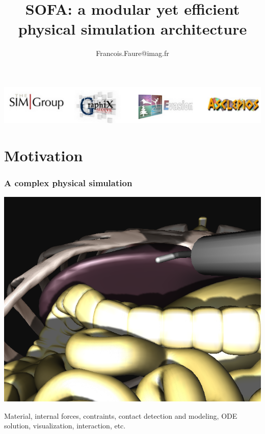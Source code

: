 \documentclass[a4paper,compress]{beamer}
\title{SOFA: a modular yet efficient physical simulation architecture}
\author{Francois.Faure@imag.fr}
\date{}
\begin{document}
\begin{frame}
  \maketitle
\begin{center}
 \includegraphics[width=\linewidth]{logos.png}
\end{center}

\end{frame}


\section{Motivation}

\begin{frame}
\frametitle{A complex physical simulation}
\begin{center}
 \includegraphics[width=0.7\linewidth]{sofa-laparoscopy1.png}
\end{center}
Material, internal forces, contraints, contact detection and modeling, ODE solution, visualization, interaction, etc.
\end{frame}
\end{document}
